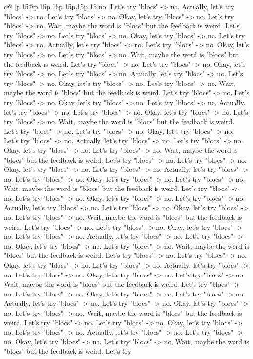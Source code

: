 \documentclass{article}
\begin{document}
{\begin{supertabular}{c@{$\;$}|p{.15\linewidth}@{}p{.15\linewidth}p{.15\linewidth}p{.15\linewidth}p{.15\linewidth}p{.15\linewidth}}
{{{no. Let's try "blocs" {-}> no. Actually, let's try "blocs" {-}> no. Let's try "blocs" {-}> no. Okay, let's try "blocs" {-}> no. Let's try "blocs" {-}> no. Wait, maybe the word is "blocs" but the feedback is weird. Let's try "blocs" {-}> no. Let's try "blocs" {-}> no. Okay, let's try "blocs" {-}> no. Let's try "blocs" {-}> no. Actually, let's try "blocs" {-}> no. Let's try "blocs" {-}> no. Okay, let's try "blocs" {-}> no. Let's try "blocs" {-}> no. Wait, maybe the word is "blocs" but the feedback is weird. Let's try "blocs" {-}> no. Let's try "blocs" {-}> no. Okay, let's try "blocs" {-}> no. Let's try "blocs" {-}> no. Actually, let's try "blocs" {-}> no. Let's try "blocs" {-}> no. Okay, let's try "blocs" {-}> no. Let's try "blocs" {-}> no. Wait, maybe the word is "blocs" but the feedback is weird. Let's try "blocs" {-}> no. Let's try "blocs" {-}> no. Okay, let's try "blocs" {-}> no. Let's try "blocs" {-}> no. Actually, let's try "blocs" {-}> no. Let's try "blocs" {-}> no. Okay, let's try "blocs" {-}> no. Let's try "blocs" {-}> no. Wait, maybe the word is "blocs" but the feedback is weird. Let's try "blocs" {-}> no. Let's try "blocs" {-}> no. Okay, let's try "blocs" {-}> no. Let's try "blocs" {-}> no. Actually, let's try "blocs" {-}> no. Let's try "blocs" {-}> no. Okay, let's try "blocs" {-}> no. Let's try "blocs" {-}> no. Wait, maybe the word is "blocs" but the feedback is weird. Let's try "blocs" {-}> no. Let's try "blocs" {-}> no. Okay, let's try "blocs" {-}> no. Let's try "blocs" {-}> no. Actually, let's try "blocs" {-}> no. Let's try "blocs" {-}> no. Okay, let's try "blocs" {-}> no. Let's try "blocs" {-}> no. Wait, maybe the word is "blocs" but the feedback is weird. Let's try "blocs" {-}> no. Let's try "blocs" {-}> no. Okay, let's try "blocs" {-}> no. Let's try "blocs" {-}> no. Actually, let's try "blocs" {-}> no. Let's try "blocs" {-}> no. Okay, let's try "blocs" {-}> no. Let's try "blocs" {-}> no. Wait, maybe the word is "blocs" but the feedback is weird. Let's try "blocs" {-}> no. Let's try "blocs" {-}> no. Okay, let's try "blocs" {-}> no. Let's try "blocs" {-}> no. Actually, let's try "blocs" {-}> no. Let's try "blocs" {-}> no. Okay, let's try "blocs" {-}> no. Let's try "blocs" {-}> no. Wait, maybe the word is "blocs" but the feedback is weird. Let's try "blocs" {-}> no. Let's try "blocs" {-}> no. Okay, let's try "blocs" {-}> no. Let's try "blocs" {-}> no. Actually, let's try "blocs" {-}> no. Let's try "blocs" {-}> no. Okay, let's try "blocs" {-}> no. Let's try "blocs" {-}> no. Wait, maybe the word is "blocs" but the feedback is weird. Let's try "blocs" {-}> no. Let's try "blocs" {-}> no. Okay, let's try "blocs" {-}> no. Let's try "blocs" {-}> no. Actually, let's try "blocs" {-}> no. Let's try "blocs" {-}> no. Okay, let's try "blocs" {-}> no. Let's try "blocs" {-}> no. Wait, maybe the word is "blocs" but the feedback is weird. Let's try "blocs" {-}> no. Let's try "blocs" {-}> no. Okay, let's try "blocs" {-}> no. Let's try "blocs" {-}> no. Actually, let's try "blocs" {-}> no. Let's try "blocs" {-}> no. Okay, let's try "blocs" {-}> no. Let's try "blocs" {-}> no. Wait, maybe the word is "blocs" but the feedback is weird. Let's try }}}
\end{supertabular}}
\end{document}

